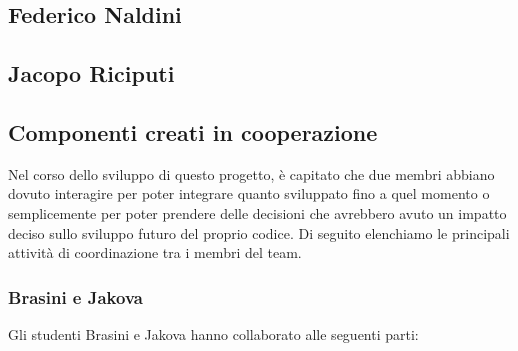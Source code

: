         \subsection{Federico Naldini}\label{subsec:naldini}
        \subsection{Jacopo Riciputi}\label{subsec:riciputi}
        
        \clearpage
        
        \subsection{Componenti creati in cooperazione}\label{subsec:cooperation}
        Nel corso dello sviluppo di questo progetto, è capitato che due membri abbiano dovuto interagire per poter integrare quanto sviluppato fino a quel momento o semplicemente per poter prendere delle decisioni che avrebbero avuto un impatto deciso sullo sviluppo futuro del proprio codice. Di seguito elenchiamo le principali attività di coordinazione tra i membri del team.
        
        
        \subsubsection{Brasini e Jakova}\label{subsub:cooperation:brasinijakova}
        Gli studenti Brasini e Jakova hanno collaborato alle seguenti parti:
        

